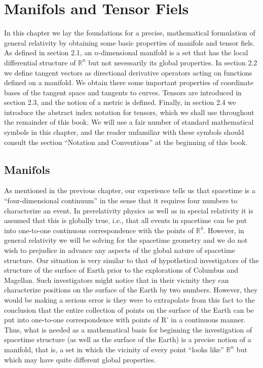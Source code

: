 \chapter{Manifols and Tensor Fiels}
In this chapter we lay the foundations for a precise, mathematical formulation of general relativity by obtaining some basic properties of manifols and tensor fiels. As defined in section 2.1, an $n$-dimensional manifold is a set that has the local differential structure of $\mathbb{R}^n$ but not necessarily its global properties. In section 2.2 we define tangent vectors as directional derivative operators acting on functions defined on a manifold. We obtain there some important properties of coordinate bases of the tangent space and tangents to curves. Tensors are introduced in section 2.3, and the notion of a metric is defined. Finally, in section 2.4 we introduce the abstract index notation for tensors, which we shall use throughout the remainder of this book. We will use a fair number of standard mathematical symbols in this chapter, and the reader unfamiliar with these symbols should consult the section ``Notation and Conventions'' at the beginning of this book.

\section{Manifols}
As mentioned in the previous chapter, our experience tells us that spacetime is a ``four-dimensional continuum'' in the sense that it requires four numbers to characterize an event. In prerelativity physics as well as in special relativity it is assumed that this is globally true, i.e., that all events in spacetime can be put into one-to-one continuous correspondence with the points of $\mathbb{R}^4$. However, in general relativity we will be solving for the spacetime geometry and we do not wish to prejudice in advance any aspects of the global nature of spacetime structure. Our situation is very similar to that of hypothetical investigators of the structure of the surface of Earth prior to the explorations of Columbus and Magellan. Such investigators might notice that in their vicinity they can characterize positions on the surface of the Earth by two numbers. However, they would be making a serious error is they were to extrapolate from this fact to the conclusion that the entire collection of points on the surface of the Earth can be put into one-to-one correspondence with points of R' in a continuous manner. Thus, what is needed as a mathematical basis for beginning the investigation of spacetime structure (as well as the surface of the Earth) is a precise notion of a manifold, that is, a set in which the vicinity of every point ``looks like'' $\mathbb{R}^n$ but which may have quite different global properties.

